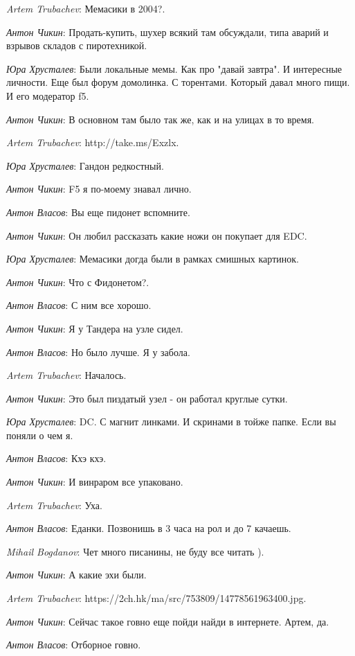 \documentclass[10pt]{book}
\newcommand{\AUTHOR}[1]{\emph{#1}:}
\begin{document}
\AUTHOR{Artem Trubachev} Мемасики в 2004?.

\AUTHOR{Антон Чикин} Продать-купить, шухер всякий там обсуждали, типа аварий и взрывов складов с пиротехникой.

\AUTHOR{Юра Хрусталев} Были локальные мемы. Как про "давай завтра". И интересные личности. Еще был форум домолинка. С торентами. Который давал много пищи. И его модератор f5.

\AUTHOR{Антон Чикин} В основном там было так же, как и на улицах в то время.

\AUTHOR{Artem Trubachev} http://take.ms/Exzlx.

\AUTHOR{Юра Хрусталев} Гандон редкостный.

\AUTHOR{Антон Чикин} F5 я по-моему знавал лично.

\AUTHOR{Антон Власов} Вы еще пидонет вспомните.

\AUTHOR{Антон Чикин} Он любил рассказать какие ножи он покупает для EDC.

\AUTHOR{Юра Хрусталев} Мемасики догда были в рамках смишных картинок.

\AUTHOR{Антон Чикин} Что с Фидонетом?.

\AUTHOR{Антон Власов} С ним все хорошо.

\AUTHOR{Антон Чикин} Я у Тандера на узле сидел.

\AUTHOR{Антон Власов} Но было лучше. Я у забола.

\AUTHOR{Artem Trubachev} Началось.

\AUTHOR{Антон Чикин} Это был пиздатый узел - он работал круглые сутки.

\AUTHOR{Юра Хрусталев} DC. С магнит линками. И скринами в тойже папке. Если вы поняли о чем я.

\AUTHOR{Антон Власов} Кхэ кхэ.

\AUTHOR{Антон Чикин} И винраром все упаковано.

\AUTHOR{Artem Trubachev} Уха.

\AUTHOR{Антон Власов} Еданки. Позвонишь в 3 часа на рол и до 7 качаешь.

\AUTHOR{Mihail Bogdanov} Чет много писанины, не буду все читать ).

\AUTHOR{Антон Чикин} А какие эхи были.

\AUTHOR{Artem Trubachev} https://2ch.hk/ma/src/753809/14778561963400.jpg.

\AUTHOR{Антон Чикин} Сейчас такое говно еще пойди найди в интернете. Артем, да.

\AUTHOR{Антон Власов} Отборное говно.
\end{document}
